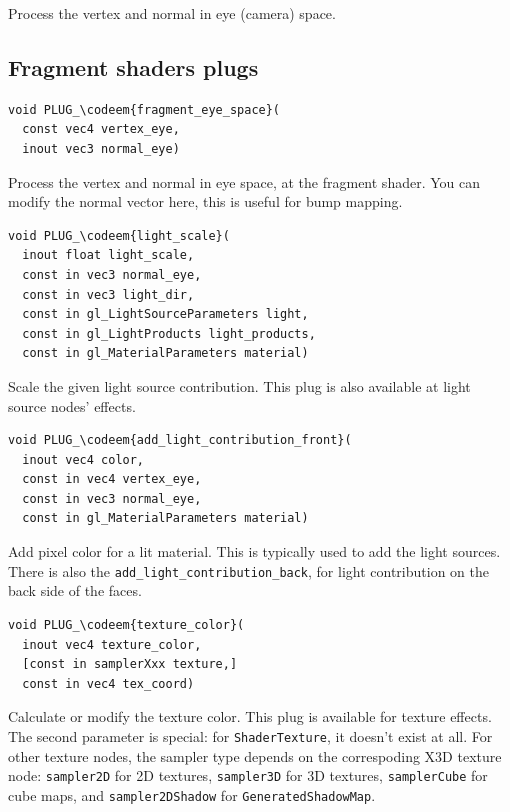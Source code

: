 \documentclass{acmsiggraph}                     %
\newcommand*{\codeem}[1]{\textbf{#1}}
\begin{document}
Process the vertex and normal in eye (camera) space.

\subsection{Fragment shaders plugs}

\begin{Verbatim}[commandchars=\\\{\},frame=single]
void PLUG_\codeem{fragment_eye_space}(
  const vec4 vertex_eye,
  inout vec3 normal_eye)
\end{Verbatim}

Process the vertex and normal in eye space, at the fragment shader.
You can modify the normal vector here, this is useful for bump mapping.

\begin{Verbatim}[commandchars=\\\{\},frame=single]
void PLUG_\codeem{light_scale}(
  inout float light_scale,
  const in vec3 normal_eye,
  const in vec3 light_dir,
  const in gl_LightSourceParameters light,
  const in gl_LightProducts light_products,
  const in gl_MaterialParameters material)
\end{Verbatim}

Scale the given light source contribution.
This plug is also available at light source nodes' effects.

\begin{Verbatim}[commandchars=\\\{\},frame=single]
void PLUG_\codeem{add_light_contribution_front}(
  inout vec4 color,
  const in vec4 vertex_eye,
  const in vec3 normal_eye,
  const in gl_MaterialParameters material)
\end{Verbatim}

Add pixel color for a lit material. This is typically used to add the light sources.
There is also the \texttt{add\_light\_contribution\_back},
for light contribution on the back side of the faces.

\begin{Verbatim}[commandchars=\\\{\},frame=single]
void PLUG_\codeem{texture_color}(
  inout vec4 texture_color,
  [const in samplerXxx texture,]
  const in vec4 tex_coord)
\end{Verbatim}

Calculate or modify the texture color.
This plug is available for texture effects. The second parameter
is special: for \texttt{ShaderTexture}, it doesn't exist at all.
For other texture nodes, the sampler type depends on the correspoding
X3D texture node: \texttt{sampler2D} for 2D textures,
\texttt{sampler3D} for 3D textures, \texttt{samplerCube} for cube
maps, and \texttt{sampler2DShadow} for \texttt{GeneratedShadowMap}.
\end{document}
